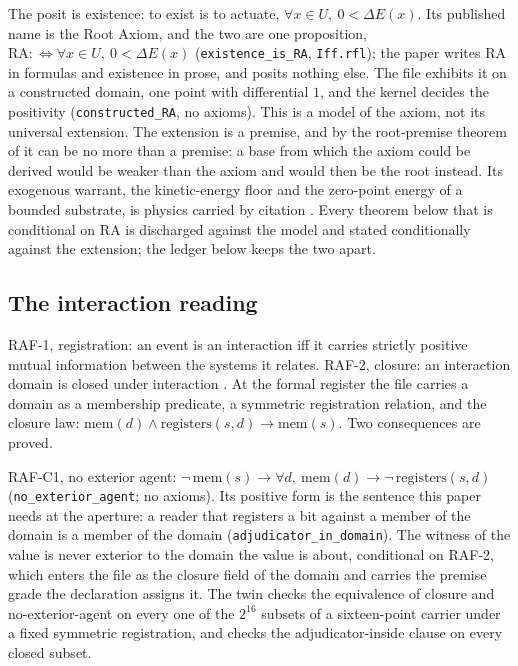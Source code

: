 \documentclass[10pt]{article}
\begin{document}
The posit is existence: to exist is to actuate,
\(\forall x \in U,\ 0 < \Delta E(x)\). Its published name is the Root
Axiom, and the two are one proposition,
\(\mathrm{RA} :\Leftrightarrow \forall x \in U,\ 0 < \Delta E(x)\)
(\texttt{existence\_\allowbreak is\_\allowbreak RA}, \texttt{Iff.rfl});
the paper writes \(\mathrm{RA}\) in formulas and existence in prose, and
posits nothing else. The file exhibits it on a constructed domain, one
point with differential \(1\), and the kernel decides the positivity
(\texttt{constructed\_\allowbreak RA}, no axioms). This is a model of
the axiom, not its universal extension. The extension is a premise, and
by the root-premise theorem of \cite{islamcodex} it can be no more than
a premise: a base from which the axiom could be derived would be weaker
than the axiom and would then be the root instead. Its exogenous
warrant, the kinetic-energy floor and the zero-point energy of a bounded
substrate, is physics carried by citation \cite{islamcodex}. Every
theorem below that is conditional on \(\mathrm{RA}\) is discharged
against the model and stated conditionally against the extension; the
ledger below keeps the two apart.

\hypertarget{the-interaction-reading}{%
\subsection{The interaction reading}\label{the-interaction-reading}}

RAF-1, registration: an event is an interaction iff it carries strictly
positive mutual information between the systems it relates. RAF-2,
closure: an interaction domain is closed under interaction
\cite{islamraf}. At the formal register the file carries a domain as a
membership predicate, a symmetric registration relation, and the closure
law:
\(\mathrm{mem}(d) \wedge \mathrm{registers}(s, d) \to \mathrm{mem}(s)\).
Two consequences are proved.

RAF-C1, no exterior agent:
\(\neg\,\mathrm{mem}(s) \to \forall d,\ \mathrm{mem}(d) \to \neg\,\mathrm{registers}(s, d)\)
(\texttt{no\_\allowbreak exterior\_\allowbreak agent}; no axioms). Its
positive form is the sentence this paper needs at the aperture: a reader
that registers a bit against a member of the domain is a member of the
domain (\texttt{adjudicator\_\allowbreak in\_\allowbreak domain}). The
witness of the value is never exterior to the domain the value is about,
conditional on RAF-2, which enters the file as the closure field of the
domain and carries the premise grade the declaration assigns it. The
twin checks the equivalence of closure and no-exterior-agent on every
one of the \(2^{16}\) subsets of a sixteen-point carrier under a fixed
symmetric registration, and checks the adjudicator-inside clause on
every closed subset.
\end{document}

